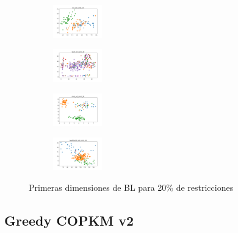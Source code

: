 \begin{figure}[H]
\begin{subfigure}
        \centering
        \includegraphics[width=0.234\textwidth]{img/bl/iris_set_const_20_3773969821_clust.png}
    \end{subfigure}
    \hfill
    \begin{subfigure}
        \centering
        \includegraphics[width=0.234\textwidth]{img/bl/ecoli_set_const_20_3773969821_clust.png}
    \end{subfigure}
    \hfill
    \begin{subfigure}
        \centering
        \includegraphics[width=0.234\textwidth]{img/bl/rand_set_const_20_3773969821_clust.png}
    \end{subfigure}
    \hfill
    \begin{subfigure}
        \centering
        \includegraphics[width=0.234\textwidth]{img/bl/newthyroid_set_const_20_3773969821_clust.png}
    \end{subfigure}
    \caption{Primeras dimensiones de BL para 20\% de restricciones}
\end{figure}

\vspace*{\fill}
\newpage

\subsection{Greedy COPKM v2}

